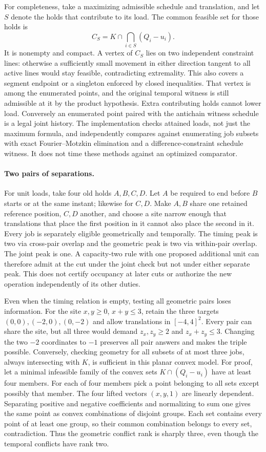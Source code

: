 \documentclass[11pt]{article}
\begin{document}
For completeness, take a maximizing admissible schedule and translation,
and let $S$ denote the holds that contribute to its load. The common
feasible set for those holds is
\[
   C_S=K\cap\bigcap_{i\in S}(Q_i-u_i).
\]
It is nonempty and compact. A vertex of $C_S$ lies on two independent
constraint lines: otherwise a sufficiently small movement in either
direction tangent to all active lines would stay feasible, contradicting
extremality. This also covers a segment endpoint or a singleton
enforced by closed inequalities. That vertex is among the enumerated
points, and the original temporal witness is still admissible at it
by the product hypothesis. Extra contributing holds cannot lower
load. Conversely an enumerated point paired with the antichain witness
schedule is a legal joint history. The implementation checks attained
loads, not just the maximum formula, and independently compares against
enumerating job subsets with exact Fourier--Motzkin elimination and a
difference-constraint schedule witness. It does not time these methods
against an optimized comparator.

\paragraph{Two pairs of separations.}
For unit loads, take four old holds $A,B,C,D$. Let $A$ be required to
end before $B$ starts or at the same instant; likewise for $C,D$.
Make $A,B$ share one retained reference position, $C,D$ another, and
choose a site narrow enough that translations that place the first
position in it cannot also place the second in it. Every job is
separately eligible geometrically and temporally. The timing peak is
two via cross-pair overlap and the geometric peak is two via within-pair
overlap. The joint peak is one. A capacity-two rule with one proposed
additional unit can therefore admit at the cut under the joint check
but not under either separate peak. This does not certify occupancy at
later cuts or authorize the new operation independently of its other duties.

Even when the timing relation is empty, testing all geometric pairs
loses information. For the site $x,y\geq0$, $x+y\leq3$, retain the
three targets $(0,0),(-2,0),(0,-2)$ and allow translations in
$[-4,4]^2$. Every pair can share the site, but all three would demand
$z_x,z_y\geq2$ and $z_x+z_y\leq3$. Changing the two $-2$ coordinates
to $-1$ preserves all pair answers and makes the triple possible.
Conversely, checking geometry for all subsets of at most three jobs,
always intersecting with $K$, is sufficient in this planar convex model.
For proof, let a minimal infeasible family of the convex sets
$K\cap(Q_i-u_i)$ have at least four members. For each of four members
pick a point belonging to all sets except possibly that member.
The four lifted vectors $(x,y,1)$ are linearly dependent. Separating
positive and negative coefficients and normalizing to sum one gives
the same point as convex combinations of disjoint groups. Each set
contains every point of at least one group, so their common combination
belongs to every set, contradiction. Thus the geometric conflict rank
is sharply three, even though the temporal conflicts have rank two.
\end{document}
